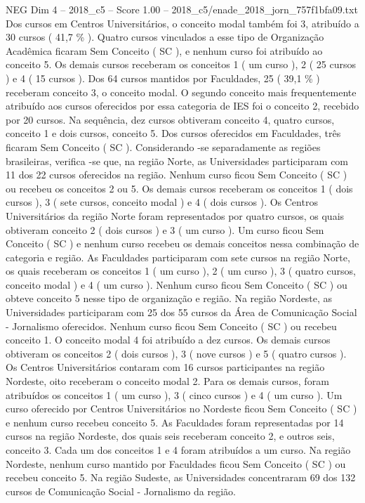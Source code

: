 \begin{textsample}{NEG Dim 4 – 2018\_c5 – Score 1.00 – 2018\_c5/enade\_2018\_jorn\_757f1bfa09.txt}
Dos cursos em Centros Universitários, o conceito modal também foi 3, atribuído a 30 cursos ( 41,7 \% ).
Quatro cursos vinculados a esse tipo de Organização Acadêmica ficaram Sem Conceito ( SC ), e nenhum curso foi atribuído ao conceito 5.
Os demais cursos receberam os conceitos 1 ( um curso ), 2 ( 25 cursos ) e 4 ( 15 cursos ).
Dos 64 cursos mantidos por Faculdades, 25 ( 39,1 \% ) receberam conceito 3, o conceito modal.
O segundo conceito mais frequentemente atribuído aos cursos oferecidos por essa categoria de IES foi o conceito 2, recebido por 20 cursos.
Na sequência, dez cursos obtiveram conceito 4, quatro cursos, conceito 1 e dois cursos, conceito 5.
Dos cursos oferecidos em Faculdades, três ficaram Sem Conceito ( SC ).
Considerando -se separadamente as regiões brasileiras, verifica -se que, na região Norte, as Universidades participaram com 11 dos 22 cursos oferecidos na região.
Nenhum curso ficou Sem Conceito ( SC ) ou recebeu os conceitos 2 ou 5.
Os demais cursos receberam os conceitos 1 ( dois cursos ), 3 ( sete cursos, conceito modal ) e 4 ( dois cursos ).
Os Centros Universitários da região Norte foram representados por quatro cursos, os quais obtiveram conceito 2 ( dois cursos ) e 3 ( um curso ).
Um curso ficou Sem Conceito ( SC ) e nenhum curso recebeu os demais conceitos nessa combinação de categoria e região.
As Faculdades participaram com sete cursos na região Norte, os quais receberam os conceitos 1 ( um curso ), 2 ( um curso ), 3 ( quatro cursos, conceito modal ) e 4 ( um curso ).
Nenhum curso ficou Sem Conceito ( SC ) ou obteve conceito 5 nesse tipo de organização e região.
Na região Nordeste, as Universidades participaram com 25 dos 55 cursos da Área de Comunicação Social - Jornalismo oferecidos.
Nenhum curso ficou Sem Conceito ( SC ) ou recebeu conceito 1.
O conceito modal 4 foi atribuído a dez cursos.
Os demais cursos obtiveram os conceitos 2 ( dois cursos ), 3 ( nove cursos ) e 5 ( quatro cursos ).
Os Centros Universitários contaram com 16 cursos participantes na região Nordeste, oito receberam o conceito modal 2.
Para os demais cursos, foram atribuídos os conceitos 1 ( um curso ), 3 ( cinco cursos ) e 4 ( um curso ).
Um curso oferecido por Centros Universitários no Nordeste ficou Sem Conceito ( SC ) e nenhum curso recebeu conceito 5.
As Faculdades foram representadas por 14 cursos na região Nordeste, dos quais seis receberam conceito 2, e outros seis, conceito 3.
Cada um dos conceitos 1 e 4 foram atribuídos a um curso.
Na região Nordeste, nenhum curso mantido por Faculdades ficou Sem Conceito ( SC ) ou recebeu conceito 5.
Na região Sudeste, as Universidades concentraram 69 dos 132 cursos de Comunicação Social - Jornalismo da região.

\end{textsample}
